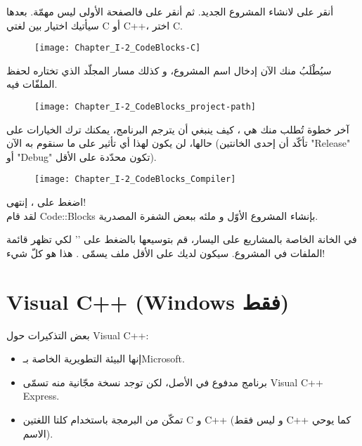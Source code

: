 أنقر على
لانشاء المشروع الجديد. ثم أنقر على
فالصفحة الأولى ليس مهمّة. بعدها سيأتيك اختيار بين لغتي \textenglish{C}
أو \textenglish{C++}،
اختر \textenglish{C}.

\begin{figure}[H]
	\centering
	\texttt{[image: Chapter\_I-2\_CodeBlocks-C]}
\end{figure}

سيُطْلَبُ منك الآن إدخال اسم المشروع، و كذلك مسار المجلّد الذي تختاره لحفظ الملفّات فيه.

\begin{figure}[H]
	\centering
	\texttt{[image: Chapter\_I-2\_CodeBlocks\_project-path]}
\end{figure}

آخر خطوة تُطلب منك هي ، كيف ينبغي أن يترجم البرنامج، يمكنك ترك الخيارات على حالها، لن يكون لهذا أي تأثير على ما سنقوم به الآن (تأكّد أن إحدى الخانتين
"\textenglish{Release}"
أو
"\textenglish{Debug}"
تكون محدّدة على الأقل).

\begin{figure}[H]
	\centering
	\texttt{[image: Chapter\_I-2\_CodeBlocks\_Compiler]}
\end{figure}

اضغط على
،
إنتهى!\\
لقد قام
\textenglish{Code::Blocks}
بإنشاء المشروع الأوّل و ملئه ببعض الشفرة المصدرية.

في الخانة الخاصة بالمشاريع على اليسار، قم بتوسيعها بالضغط على
'\InlineCode{+}'
لكي تظهر قائمة الملفات في المشروع. سيكون لديك على الأقل ملف يسمّى
.
هذا هو كلّ شيء!

\section{\textenglish{Visual C++} (\textenglish{Windows} فقط)}

بعض التذكيرات حول
\textenglish{Visual C++}:

\begin{itemize}
  \item إنها البيئة التطويرية الخاصة بـ\textenglish{Microsoft}.
  \item برنامج مدفوع في الأصل، لكن توجد نسخة مجّانية منه تسمّى \textenglish{Visual C++ Express}.
  \item تمكّن من البرمجة باستخدام كلتا اللغتين
\textenglish{C}
و
\textenglish{C++}
(و ليس فقط
\textenglish{C++}
كما يوحي الاسم).
\end{itemize}

